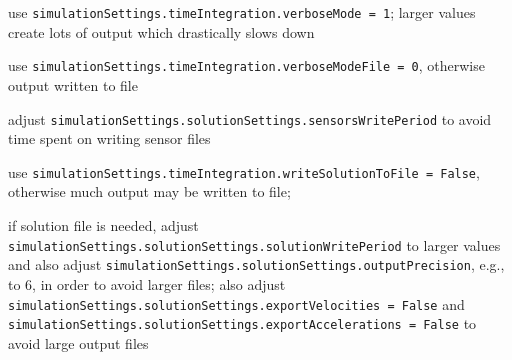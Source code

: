   \item use \texttt{simulationSettings.timeIntegration.verboseMode = 1}; larger values create lots of output which drastically slows down
  \item use \texttt{simulationSettings.timeIntegration.verboseModeFile = 0}, otherwise output written to file
  \item adjust \texttt{simulationSettings.solutionSettings.sensorsWritePeriod} to avoid time spent on writing sensor files
  \item use \texttt{simulationSettings.timeIntegration.writeSolutionToFile = False}, otherwise much output may be written to file; 
  \item if solution file is needed, adjust \texttt{simulationSettings.solutionSettings.solutionWritePeriod} to larger values and also adjust \texttt{simulationSettings.solutionSettings.outputPrecision}, e.g., to 6, in order to avoid larger files; also adjust \texttt{simulationSettings.solutionSettings.exportVelocities = False} and \texttt{simulationSettings.solutionSettings.exportAccelerations = False} to avoid large output files
\ei


